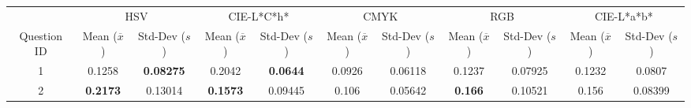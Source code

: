 \begin{table}[htbp]
  \centering
  \resizebox{0.8\textwidth}{!} {
  \begin{tabular}{@{}ccccccccccc@{}}
    \toprule
                                  & \multicolumn{2}{c}{HSV}                                                                                                                              & \multicolumn{2}{c}{CIE-L*C*h*}                                                                                               & \multicolumn{2}{c}{CMYK}                                                                                                     & \multicolumn{2}{c}{RGB}                                                                                                      & \multicolumn{2}{c}{CIE-L*a*b*}                                                                                               \\ \cmidrule(l){2-11}
    \multirow{-2}{*}{Question ID} & Mean ($\overline{x}$)                                                                  & Std-Dev ($s$)                                             & Mean ($\overline{x}$)                                           & Std-Dev ($s$)                                            & Mean ($\overline{x}$)                                           & Std-Dev ($s$)                                            & Mean ($\overline{x}$)                                           & Std-Dev ($s$)                                            & \multicolumn{1}{c|}{Mean ($\overline{x}$)}                      & \multicolumn{1}{c|}{Std-Dev ($s$)}                       \\ \midrule
    \multicolumn{1}{c|}{1}        & \multicolumn{1}{c|}{0.1258}                                                         & \multicolumn{1}{c||}{\cellcolor[HTML]{32CB00}\textbf{0.08275}}  & \multicolumn{1}{c|}{0.2042}                                  & \multicolumn{1}{c||}{\cellcolor[HTML]{32CB00}\textbf{0.0644}}  & \multicolumn{1}{c|}{0.0926}                                  & \multicolumn{1}{c||}{0.06118}                                  & \multicolumn{1}{c|}{0.1237}                                  & \multicolumn{1}{c||}{0.07925}                                  & \multicolumn{1}{c|}{0.1232}                                  & \multicolumn{1}{c|}{0.0807}                                   \\ \midrule
    \multicolumn{1}{c|}{2}        & \multicolumn{1}{c|}{\cellcolor[HTML]{FD6864}\textbf{0.2173}}                        & \multicolumn{1}{c||}{0.13014}                                   & \multicolumn{1}{c|}{\cellcolor[HTML]{32CB00}\textbf{0.1573}} & \multicolumn{1}{c||}{0.09445}                                  & \multicolumn{1}{c|}{0.106}                                   & \multicolumn{1}{c||}{0.05642}                                  & \multicolumn{1}{c|}{\cellcolor[HTML]{FD6864}\textbf{0.166}}  & \multicolumn{1}{c||}{0.10521}                                  & \multicolumn{1}{c|}{0.156}                                   & \multicolumn{1}{c|}{0.08399}                                  \\ \midrule \midrule

\end{tabular}}
\end{table}
